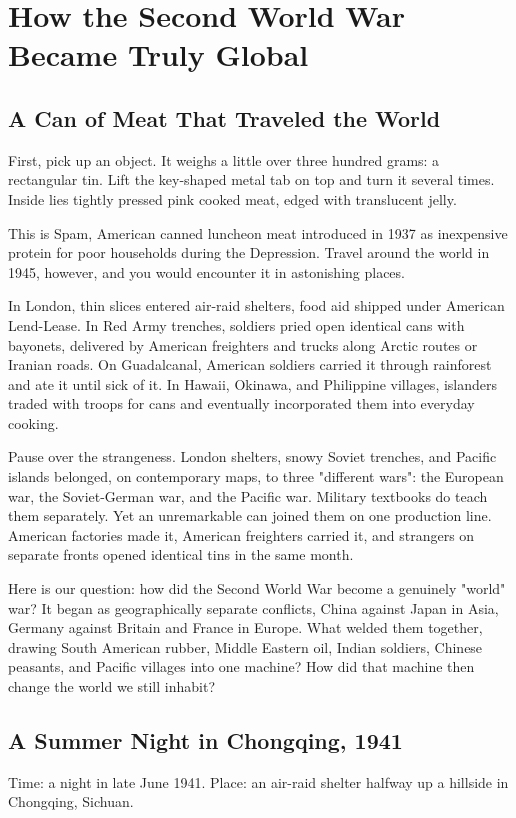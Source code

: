 \chapter[World War II Becomes Global]{How the Second World War Became Truly Global}
\section{A Can of Meat That Traveled the World}
First, pick up an object. It weighs a little over three hundred grams: a rectangular tin. Lift the key-shaped metal tab on top and turn it several times. Inside lies tightly pressed pink cooked meat, edged with translucent jelly.

This is Spam, American canned luncheon meat introduced in 1937 as inexpensive protein for poor households during the Depression. Travel around the world in 1945, however, and you would encounter it in astonishing places.

In London, thin slices entered air-raid shelters, food aid shipped under American Lend-Lease. In Red Army trenches, soldiers pried open identical cans with bayonets, delivered by American freighters and trucks along Arctic routes or Iranian roads. On Guadalcanal, American soldiers carried it through rainforest and ate it until sick of it. In Hawaii, Okinawa, and Philippine villages, islanders traded with troops for cans and eventually incorporated them into everyday cooking.

Pause over the strangeness. London shelters, snowy Soviet trenches, and Pacific islands belonged, on contemporary maps, to three "different wars": the European war, the Soviet-German war, and the Pacific war. Military textbooks do teach them separately. Yet an unremarkable can joined them on one production line. American factories made it, American freighters carried it, and strangers on separate fronts opened identical tins in the same month.

Here is our question: how did the Second World War become a genuinely "world" war? It began as geographically separate conflicts, China against Japan in Asia, Germany against Britain and France in Europe. What welded them together, drawing South American rubber, Middle Eastern oil, Indian soldiers, Chinese peasants, and Pacific villages into one machine? How did that machine then change the world we still inhabit?

\section{A Summer Night in Chongqing, 1941}
Time: a night in late June 1941. Place: an air-raid shelter halfway up a hillside in Chongqing, Sichuan.

